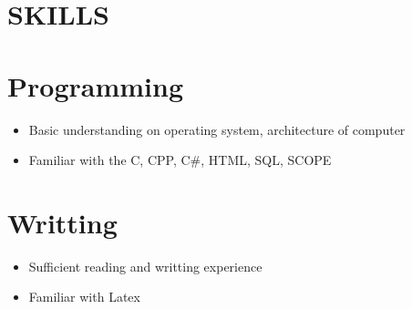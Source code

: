 \documentclass[margin]{res}
\begin{document}
\begin{resume}
\section{SKILLS} 
\normalsize{\section{Programming}}
                 \begin{itemize}
                 \item Basic understanding on operating system, architecture of computer
		 \item Familiar with the C, CPP, C\#, HTML, SQL, SCOPE
                 \end{itemize}
\normalsize{\section{Writting}} 
                 \begin{itemize}
                  \item Sufficient reading and writting experience
		  \item Familiar with Latex
                  \end{itemize}
 

\end{resume}
\end{document}

